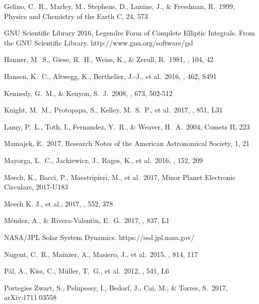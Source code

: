 \documentclass[a4paper,fleqn,usenatbib]{mnras}
\begin{document}
\begin{thebibliography}{99}
 Gelino, C.~R., Marley, M., Stephens, D., Lunine, J., \& Freedman, R.\ 1999, Physics and Chemistry of the Earth C, 24, 573 

 GNU Scientific Library 2016, Legendre Form of Complete Elliptic Integrals. From the GNU Scientific Library. http://www.gnu.org/software/gsl

 Hanner, M.~S., Giese, R.~H., Weiss, K., \& Zerull, R.\ 1981, \aap, 104, 42 

 Hansen, K.~C., Altwegg, K., Berthelier, J.-J., et al.\ 2016, \mnras, 462, S491 

 Kennedy, G.~M., \& Kenyon, S.~J.\ 2008, \apj, 673, 502-512 

 Knight, M.~M., Protopapa, S., Kelley, M.~S.~P., et al.\ 2017, \apjl, 851, L31 

 Lamy, P.~L., Toth, I., Fernandez, Y.~R., \& Weaver, H.~A.\ 2004, Comets II, 223 

 Mamajek, E.\ 2017, Research Notes of the American Astronomical Society, 1, 21 

 Mayorga, L.~C., Jackiewicz, J., Rages, K., et al.\ 2016, \aj, 152, 209 

 Meech, K., Bacci, P., Maestripieri, M., et al.\ 2017, Minor Planet Electronic Circulars, 2017-U183

 Meech K. J., et al., 2017, \nat, 552, 378

 M{\'e}ndez, A., \& Rivera-Valent{\'{\i}}n, E.~G.\ 2017, \apjl, 837, L1 

 NASA/JPL Solar System Dynamics. https://ssd.jpl.nasa.gov/

 Nugent, C.~R., Mainzer, A., Masiero, J., et al.\ 2015, \apj, 814, 117 

 P{\'a}l, A., Kiss, C., M{\"u}ller, T.~G., et al.\ 2012, \aap, 541, L6 

 Portegies Zwart, S., Pelupessy, I., Bedorf, J., Cai, M., \& Torres, S.\ 2017, arXiv:1711.03558


\end{thebibliography}
\end{document}
